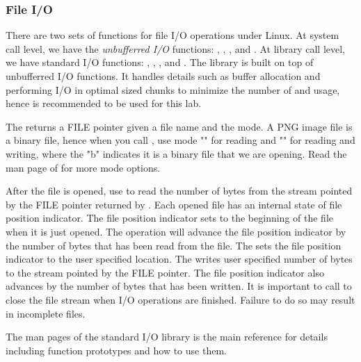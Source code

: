 \subsubsection{File I/O}
There are two sets of functions for file I/O operations under Linux. At system call level, we have the {\em unbufferred I/O} functions: , , ,  and . At library call level, we have standard I/O functions: , , ,  and . The library is built on top of unbufferred I/O functions. It handles details such as buffer allocation and performing I/O in optimal sized chunks to minimize the number of  and  usage, hence is recommended to be used for this lab.

The  returns a FILE pointer given a file name and the mode. A PNG image file is a binary file, hence when you call , use mode "" for reading and "" for reading and writing, where the "b" indicates it is a binary file that we are opening. Read the man page of  for more mode options. 

After the file is opened, use  to read the number of bytes from the stream pointed by the FILE pointer returned by . Each opened file has an internal state of file position indicator. The file position indicator sets to the beginning of the file when it is just opened. The  operation will advance the file position indicator by the number of bytes that has been read from the file. The  sets the file position indicator to the user specified location. The  writes user specified number of bytes to the stream pointed by the FILE pointer. The file position indicator also advances by the number of bytes that has been written. It is important to call  to close the file stream when I/O operations are finished. Failure to do so may result in incomplete files.  

The man pages of the standard I/O library is the main reference for details including function prototypes and how to use them.   

